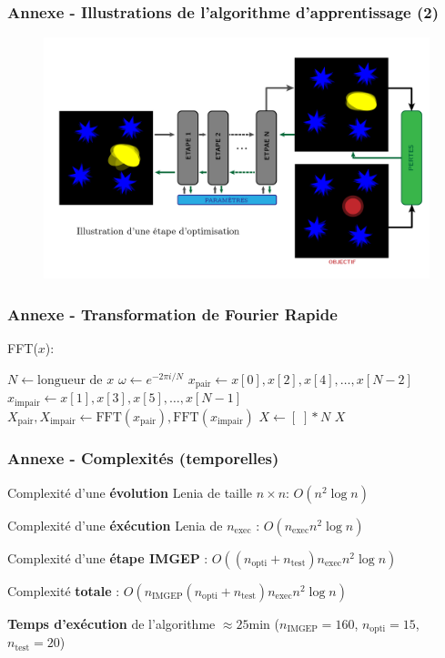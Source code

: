 \documentclass[aspectratio=43]{beamer}
\begin{document}
\begin{frame}
	\frametitle{Annexe - Illustrations de l'algorithme d'apprentissage (2)}
	\begin{figure}[H]
		\centering
		\includegraphics[width=\textwidth]{illustration_optimization_step.png}
	\end{figure}
\end{frame}

\begin{frame}
	\frametitle{Annexe - Transformation de Fourier Rapide}
	\begin{block}{FFT($x$):}
		\begin{algorithm}[H]
			$N \gets \text{longueur de } x$ \;
			$\omega \gets e^{-2\pi i / N}$ \;
			$x_{\text{pair}} \gets x[0], x[2], x[4], \ldots, x[N-2]$ \;
			$x_{\text{impair}} \gets x[1], x[3], x[5], \ldots, x[N-1]$ \;
			$X_{\text{pair}}, X_{\text{impair}} \gets \text{FFT}(x_{\text{pair}}), \text{FFT}(x_{\text{impair}})$ \;
			$X \gets [\;] * N$ \;
			\Return $X$
		\end{algorithm}	
	\end{block}
\end{frame}

\begin{frame}
	\frametitle{Annexe - Complexités (temporelles)}
	
	Complexité d'une \textbf{évolution} Lenia de taille $n \times n$: $O(n^2 \log n)$ 
	\vfill

	Complexité d'une \textbf{éxécution} Lenia de $n_{\text{exec}}$ : $O(n_{\text{exec}}n^2 \log n)$
	\vfill

	Complexité d'une \textbf{étape IMGEP} : $O((n_{\text{opti}} + n_{\text{test}})n_{\text{exec}}n^2 \log n)$
	\vfill
	
	Complexité \textbf{totale} : $O(n_{\text{IMGEP}}(n_{\text{opti}} + n_{\text{test}})n_{\text{exec}}n^2 \log n)$
	\vfill

	\textbf{Temps d'exécution} de l'algorithme $\approx 25 \text{min}$ ($n_{\text{IMGEP}} = 160$, $n_{\text{opti}} = 15$, $n_{\text{test}} = 20$)
\end{frame}
\end{document}
